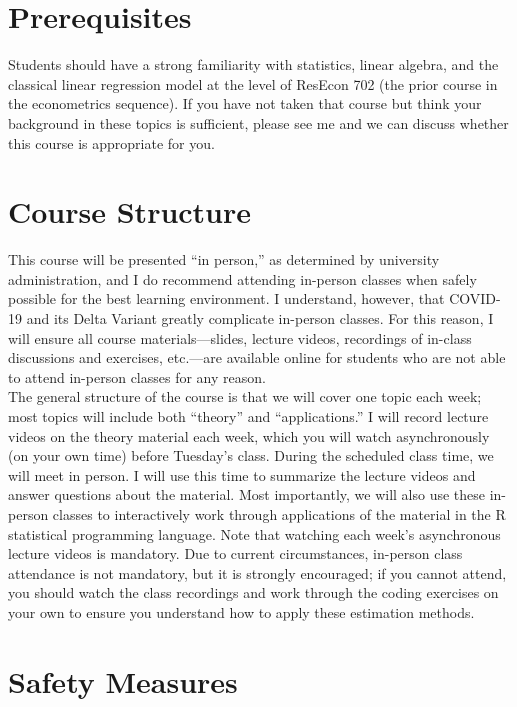\documentclass[11pt,letterpaper]{article}
\begin{document}
\section*{Prerequisites}

Students should have a strong familiarity with statistics, linear algebra, and the classical linear regression model at the level of ResEcon 702 (the prior course in the econometrics sequence). If you have not taken that course but think your background in these topics is sufficient, please see me and we can discuss whether this course is appropriate for you.

\section*{Course Structure}

This course will be presented ``in person,'' as determined by university administration, and I do recommend attending in-person classes when safely possible for the best learning environment. I understand, however, that COVID-19 and its Delta Variant greatly complicate in-person classes. For this reason, I will ensure all course materials---slides, lecture videos, recordings of in-class discussions and exercises, etc.---are available online for students who are not able to attend in-person classes for any reason. \\

\noindent The general structure of the course is that we will cover one topic each week; most topics will include both ``theory'' and ``applications.'' I will record lecture videos on the theory material each week, which you will watch asynchronously (on your own time) before Tuesday's class. During the scheduled class time, we will meet in person. I will use this time to summarize the lecture videos and answer questions about the material. Most importantly, we will also use these in-person classes to interactively work through applications of the material in the R statistical programming language. Note that watching each week's asynchronous lecture videos is mandatory. Due to current circumstances, in-person class attendance is not mandatory, but it is strongly encouraged; if you cannot attend, you should watch the class recordings and work through the coding exercises on your own to ensure you understand how to apply these estimation methods.

\section*{Safety Measures}
\end{document}
